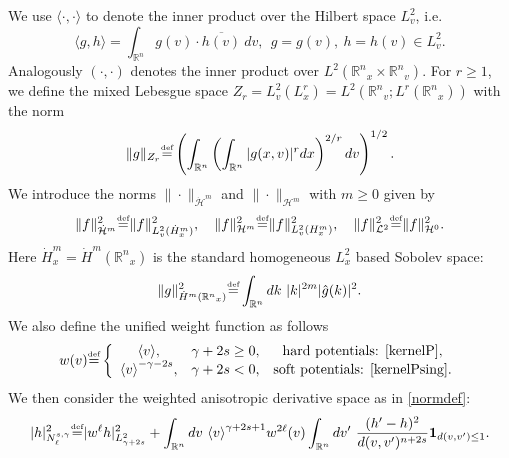 \documentclass{amsart}
\numberwithin{equation}{section}
\begin{document}
We use $\langle\cdot,\cdot\rangle$ to denote the inner product over the Hilbert space $L^2_{v}$, i.e.
\begin{equation*}
    \langle g,h\rangle=\int_{{\mathbb R}^{n}} g({v})\cdot \overline{h({v})} ~ d{v},\ \ g=g({v}), ~h=h({v})\in
    L^2_{v}.
\end{equation*}
Analogously $\left(\cdot,\cdot\right)$ denotes the inner product over $L^2({{\mathbb R}^{n}}_x\times{{\mathbb R}^{n}}_{v})$.
For $r\geq 1$, we define the mixed Lebesgue
space $Z_r=L^2_{v}(L^r_x)=L^2({{\mathbb R}^{n}}_{v};L^r({{\mathbb R}^{n}}_x))$ with the norm
\begin{equation*}
\|g\|_{Z_r}{\overset{\mbox{\tiny{def}}}{=}} \left(\int_{{\mathbb R}^{n}}\left(\int_{{\mathbb R}^{n}}
    |g(x,{v})|^rdx\right)^{2/r}d{v}\right)^{1/2}.
\end{equation*}
We introduce the norms
$\|\cdot\|_{{\dot{\mathcal{H}}}^m}$ and $\|\cdot\|_{{\mathcal{H}}^m}$ with $m\geq 0$ given by
\begin{equation}\label{brief.norm}
    \|{f}\|_{{\dot{\mathcal{H}}}^m}^2{\overset{\mbox{\tiny{def}}}{=}} \|{f}\|_{L^2_{v}(\dot{H}^m_x)}^2,
    \quad
    \|{f}\|_{{\mathcal{H}}^m}^2{\overset{\mbox{\tiny{def}}}{=}} \|{f}\|_{L^2_{v}(H^m_x)}^2,
    \quad
    \|{f}\|_{{\mathcal{L}}^2}^2 {\overset{\mbox{\tiny{def}}}{=}}\|{f}\|_{{\mathcal{H}}^0}^2.
\end{equation}
Here $\dot{H}^m_x=\dot{H}^m({{\mathbb R}^{n}}_x)$ is the standard homogeneous $L^2_x$ based Sobolev space:
$$
\| g \|_{\dot{H}^m({{\mathbb R}^{n}}_x)}^2 {\overset{\mbox{\tiny{def}}}{=}} \int_{{\mathbb R}^{n}} dk ~ |k|^{2m} | \hat{g}(k)|^2.
$$
We also define the unified weight function as follows
\begin{equation}
w(v) 
{\overset{\mbox{\tiny{def}}}{=}} 
\left\{
\begin{array}{ccc}
{ \left< {{v}} \right> }, &\gamma + 2s \ge 0, & \text{hard potentials: \eqref{kernelP}}, \\
{ \left< {{v}} \right> }^{-\gamma - 2s}, & \gamma + 2s < 0, & \text{soft potentials: \eqref{kernelPsing}.}\\
\end{array}
\right.
\label{weigh}
\end{equation}
We then consider the weighted anisotropic derivative space as in \eqref{normdef}: 
 \begin{gather*}
{|} h {|}^2_{N^{s,\gamma}_\ell}
{\overset{\mbox{\tiny{def}}}{=}} 
{|} w^{\ell} h{|}_{L^2_{\gamma+2s}}^2 + \int_{\mathbb{R}^n} dv ~ 
{ \left< {{v}} \right> }^{\gamma+2s+1} w^{2\ell}(v)
\int_{\mathbb{R}^n} dv' 
~
 \frac{(h' - h)^2}{d(v,v')^{n+2s}} 
{ {\mathbf 1}}_{d(v,v') \leq 1}.
\end{gather*}
\end{document}
